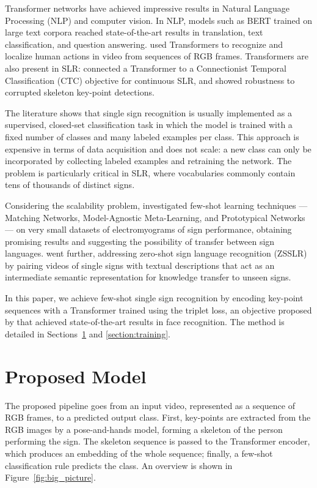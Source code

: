 \documentclass{article}
\begin{document}
Transformer networks \cite{vaswani2017attention} have achieved impressive results in Natural Language Processing (NLP) and computer vision. In NLP, models such as BERT \cite{devlin2018bert} trained on large text corpora reached state-of-the-art results in translation, text classification, and question answering. \cite{girdhar2019video} used Transformers to recognize and localize human actions in video from sequences of RGB frames. Transformers are also present in SLR: \cite{camgoz2020sign} connected a Transformer to a Connectionist Temporal Classification (CTC) objective for continuous SLR, and \cite{jiang2021skeletor} showed robustness to corrupted skeleton key-point detections.

The literature shows that single sign recognition is usually implemented as a supervised, closed-set classification task in which the model is trained with a fixed number of classes and many labeled examples per class. This approach is expensive in terms of data acquisition and does not scale: a new class can only be incorporated by collecting labeled examples and retraining the network. The problem is particularly critical in SLR, where vocabularies commonly contain tens of thousands of distinct signs.

Considering the scalability problem, \cite{shovkopliassupport} investigated few-shot learning techniques --- Matching Networks, Model-Agnostic Meta-Learning, and Prototypical Networks --- on very small datasets of electromyograms of sign performance, obtaining promising results and suggesting the possibility of transfer between sign languages. \cite{bilge2022towards} went further, addressing zero-shot sign language recognition (ZSSLR) by pairing videos of single signs with textual descriptions that act as an intermediate semantic representation for knowledge transfer to unseen signs.

In this paper, we achieve few-shot single sign recognition by encoding key-point sequences with a Transformer trained using the triplet loss, an objective proposed by \cite{schroff2015facenet} that achieved state-of-the-art results in face recognition. The method is detailed in Sections~\ref{section:model} and \ref{section:training}.

\section{Proposed Model}
\label{section:model}
The proposed pipeline goes from an input video, represented as a sequence of RGB frames, to a predicted output class. First, key-points are extracted from the RGB images by a pose-and-hands model, forming a skeleton of the person performing the sign. The skeleton sequence is passed to the Transformer encoder, which produces an embedding of the whole sequence; finally, a few-shot classification rule predicts the class. An overview is shown in Figure~\ref{fig:big_picture}.
\end{document}
